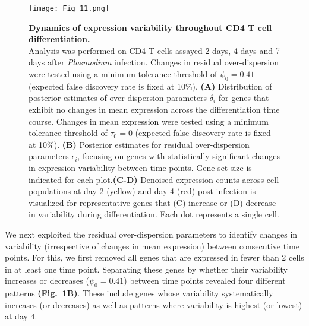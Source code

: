 \begin{figure}[!h]
\centering
\texttt{[image: Fig\_11.png]}
\caption[Dynamics of expression variability throughout CD4\plus{} T cell differentiation]{\textbf{Dynamics of expression variability throughout CD4\plus{} T cell differentiation.}\\
Analysis was performed on CD4\plus{} T cells assayed 2 days, 4 days and 7 days after \textit{Plasmodium} infection. Changes in residual over-dispersion were tested using a minimum tolerance threshold of $\psi_0=0.41$ (expected false discovery rate is fixed at 10\%). \textbf{(A)} Distribution of posterior estimates of over-dispersion parameters $\delta_i$ for genes that exhibit no changes in mean expression across the differentiation time course. Changes in mean expression were tested using a minimum tolerance threshold of $\tau_0=0$ (expected false discovery rate is fixed at 10\%). \textbf{(B)} Posterior estimates for residual over-dispersion parameters  $\epsilon_i$, focusing on genes with statistically significant changes in expression variability between time points. Gene set size is indicated for each plot.\textbf{(C-D)} Denoised expression counts across cell populations at day 2 (yellow) and day 4 (red) post infection is visualized for representative genes that (C) increase or (D) decrease in variability during differentiation. Each dot represents a single cell.\\}
\label{fig2:immune_differentiation}
\end{figure}

We next exploited the residual over-dispersion parameters to identify changes in variability (irrespective of changes in mean expression) between consecutive time points. For this, we first removed all genes that are expressed in fewer than 2 cells in at least one time point. Separating these genes by whether their variability increases or decreases ($\psi_0 = 0.41$) between time points revealed four different patterns \textbf{(Fig.~\ref{fig2:immune_differentiation}B)}. These include genes whose variability systematically increases (or decreases) as well as patterns where variability is highest (or lowest) at day 4. \\


